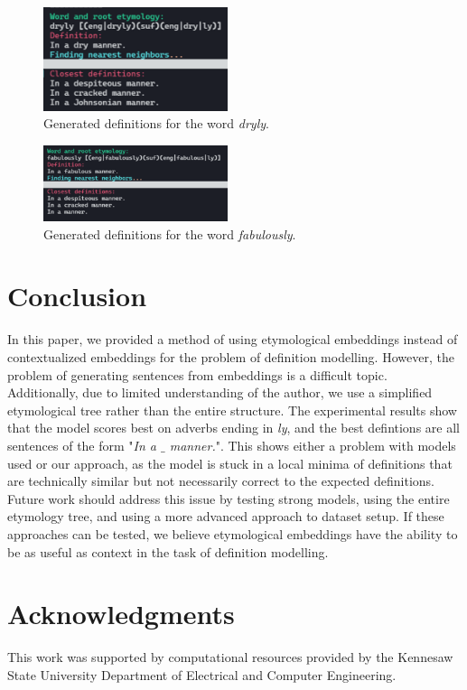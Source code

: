 \documentclass[11pt,a4paper]{article}
\begin{document}
\begin{figure}
  \centering
  \includegraphics[width=0.48\textwidth]{assets/dryly_defs.png}
  \caption{Generated definitions for the word \textit{dryly}.}
  \label{fig:generated_definition_1}
\end{figure}

\begin{figure}
  \centering
  \includegraphics[width=0.48\textwidth]{assets/fabulously_defs.png}
  \caption{Generated definitions for the word \textit{fabulously}.}
  \label{fig:generated_definition_2}
\end{figure}

\FloatBarrier
\section{Conclusion}
In this paper, we provided a method of using etymological embeddings instead of
contextualized embeddings for the problem of definition modelling. However, the
problem of generating sentences from embeddings is a difficult topic.
Additionally, due to limited understanding of the author, we use a simplified
etymological tree rather than the entire structure. The experimental results
show that the model scores best on adverbs ending in \textit{ly}, and the best
defintions are all sentences of the form "\textit{In a $\_$ manner.}". This
shows either a problem with models used or our approach, as the model is stuck
in a local minima of definitions that are technically similar but not
necessarily correct to the expected definitions. Future work should address this
issue by testing strong models, using the entire etymology tree, and using a
more advanced approach to dataset setup. If these approaches can be tested, we
believe etymological embeddings have the ability to be as useful as context in
the task of definition modelling.

\section*{Acknowledgments}
This work was supported by computational resources provided by the Kennesaw
State University Department of Electrical and Computer Engineering.



\end{document}
